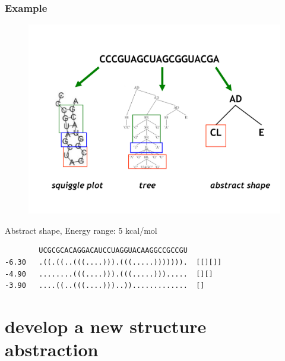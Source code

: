 \documentclass[ignorenonframetext,10pt]{beamer}
\begin{document}
\begin{frame}
\frametitle{Example }
\begin{figure}
  \includegraphics[scale=0.4]{images/shrep_example.pdf} 
\end{figure}
\end{frame}


\begin{frame}[fragile]
  \begin{block}{\small Abstract shape, Energy range: 5 kcal/mol}
  \begin{verbatim}
        UCGCGCACAGGACAUCCUAGGUACAAGGCCGCCGU
-6.30   .((.((..(((....))).(((.....))))))).  [[][]]
-4.90   ........(((....))).(((.....))).....  [][]
-3.90   ....((..(((....)))..)).............  []
  \end{verbatim}
  \end{block}
\end{frame}


\section{develop a new structure abstraction}
\end{document}
